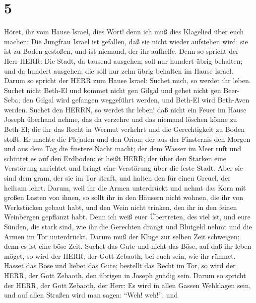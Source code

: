 \hypertarget{section-4}{%
\section{5}\label{section-4}}

 Höret, ihr vom Hause Israel, dies Wort! denn ich muß dies
Klagelied über euch machen:  Die Jungfrau Israel ist
gefallen, daß sie nicht wieder aufstehen wird; sie ist zu Boden
gestoßen, und ist niemand, der ihr aufhelfe.  Denn so
spricht der Herr HERR: Die Stadt, da tausend ausgehen, soll nur hundert
übrig behalten; und da hundert ausgehen, die soll nur zehn übrig
behalten im Hause Israel.  Darum so spricht der HERR zum
Hause Israel: Suchet mich, so werdet ihr leben.  Suchet
nicht Beth-El und kommet nicht gen Gilgal und gehet nicht gen Beer-Seba;
den Gilgal wird gefangen weggeführt werden, und Beth-El wird Beth-Aven
werden.  Suchet den HERRN, so werdet ihr leben! daß nicht
ein Feuer im Hause Joseph überhand nehme, das da verzehre und das
niemand löschen könne zu Beth-El;  die ihr das Recht in
Wermut verkehrt und die Gerechtigkeit zu Boden stoßt.  Er
machte die Plejaden und den Orion; der aus der Finsternis den Morgen und
aus dem Tag die finstere Nacht macht; der dem Wasser im Meer ruft und
schüttet es auf den Erdboden: er heißt HERR;  der über den
Starken eine Verstörung anrichtet und bringt eine Verstörung über die
feste Stadt.  Aber sie sind dem gram, der sie im Tor
straft, und halten den für einen Greuel, der heilsam lehrt.
 Darum, weil ihr die Armen unterdrückt und nehmt das Korn
mit großen Lasten von ihnen, so sollt ihr in den Häusern nicht wohnen,
die ihr von Werkstücken gebaut habt, und den Wein nicht trinken, den ihr
in den feinen Weinbergen gepflanzt habt.  Denn ich weiß
euer Übertreten, des viel ist, und eure Sünden, die stark sind, wie ihr
die Gerechten drängt und Blutgeld nehmt und die Armen im Tor
unterdrückt.  Darum muß der Kluge zur selben Zeit
schweigen; denn es ist eine böse Zeit.  Suchet das Gute und
nicht das Böse, auf daß ihr leben möget, so wird der HERR, der Gott
Zebaoth, bei euch sein, wie ihr rühmet.  Hasset das Böse
und liebet das Gute; bestellt das Recht im Tor, so wird der HERR, der
Gott Zebaoth, den übrigen in Joseph gnädig sein.  Darum so
spricht der HERR, der Gott Zebaoth, der Herr: Es wird in allen Gassen
Wehklagen sein, und auf allen Straßen wird man sagen: ``Weh! weh!'', und

